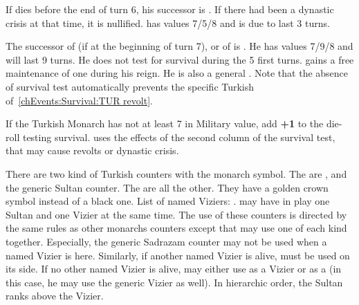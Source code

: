  If  dies before
the end of turn 6, his successor is . If there had
been a dynastic crisis at that time, it is nullified. 
has values 7/5/8 and is due to last 3 turns.

 The successor of  (if at the beginning of turn 7), or of  is
. He has values 7/9/8 and will last 9 turns. He does
not test for survival during the 5 first turns. \TUR gains a free
maintenance of one \ARMY\faceplus \Janissaire during his reign. He is
also a general .
\bparag Note that the absence of survival test automatically prevents the
specific Turkish \REVOLT of~\ref{chEvents:Survival:TUR revolt}.

 If the Turkish
Monarch has not at least 7 in Military value, add {\bf +1} to the
die-roll testing survival.
\bparag \TUR uses the effects of the second column of the survival test,
that may cause revolts or dynastic crisis.


 There are two kind of Turkish
counters with the monarch symbol.
\bparag The  are \leaderSuleyman, \leaderSelim and the
generic Sultan counter.
\bparag The  are all the other. They have a golden crown
symbol instead of a black one.
\bparag List of named Viziers: .
\bparag \TUR may have in play one Sultan and one Vizier at the same
time. The use of these counters is directed by the same rules as other
monarchs counters except that \TUR may use one of each kind together.
\bparag Especially, the generic Sadrazam counter may not be used when
a named Vizier is here.
\bparag Similarly, if another named Vizier is alive, \leaderSinan must
be used on its \LeaderC side. If no other named Vizier is alive, \TUR
may either use \leaderSinan as a Vizier or as a \LeaderC (in this
case, he may use the generic Vizier as well).
\bparag In hierarchic order, the Sultan ranks above the Vizier.

